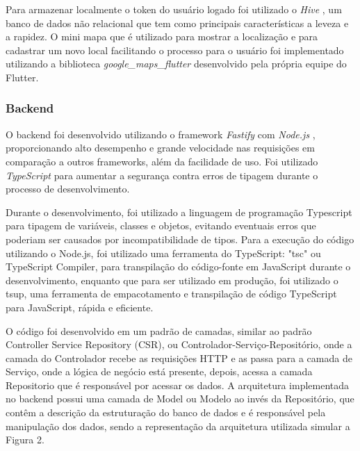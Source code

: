     Para armazenar localmente o token do usuário logado foi utilizado o \textit{Hive} \cite{hive}, um banco de dados não relacional que tem como principais características a leveza e a rapidez. O mini mapa que é utilizado para mostrar a localização e para cadastrar um novo local facilitando o processo para o usuário foi implementado utilizando a biblioteca \textit{google\_maps\_flutter} \cite{googlemapsflutter} desenvolvido pela própria equipe do Flutter. 

\subsubsection{Backend}

    O backend foi desenvolvido utilizando o framework \textit{Fastify} \cite{fastify} com \textit{Node.js} \cite{nodejs}, proporcionando alto desempenho e grande velocidade nas requisições em comparação a outros frameworks, além da facilidade de uso. Foi utilizado \textit{TypeScript} \cite{typescript} para aumentar a segurança contra erros de tipagem durante o processo de desenvolvimento.
    
    Durante o desenvolvimento, foi utilizado a linguagem de programação Typescript para tipagem de variáveis, classes e objetos, evitando eventuais erros que poderiam ser causados por incompatibilidade de tipos. Para a execução do código utilizando o Node.js, foi utilizado uma ferramenta do TypeScript: "tsc" ou TypeScript Compiler, para transpilação do código-fonte em JavaScript durante o desenvolvimento, enquanto que para ser utilizado em produção, foi utilizado o tsup, uma ferramenta de empacotamento e transpilação de código TypeScript para JavaScript, rápida e eficiente.

    O código foi desenvolvido em um padrão de camadas, similar ao padrão Controller Service Repository (CSR), ou Controlador-Serviço-Repositório, onde a camada do Controlador recebe as requisições HTTP e as passa para a camada de Serviço, onde a lógica de negócio está presente, depois, acessa a camada Repositorio que é responsável por acessar os dados. A arquitetura implementada no backend possui uma camada de Model ou Modelo ao invés da Repositório, que contêm a descrição da estruturação do banco de dados e é responsável pela manipulação dos dados, sendo a representação da arquitetura utilizada simular a Figura 2. 

